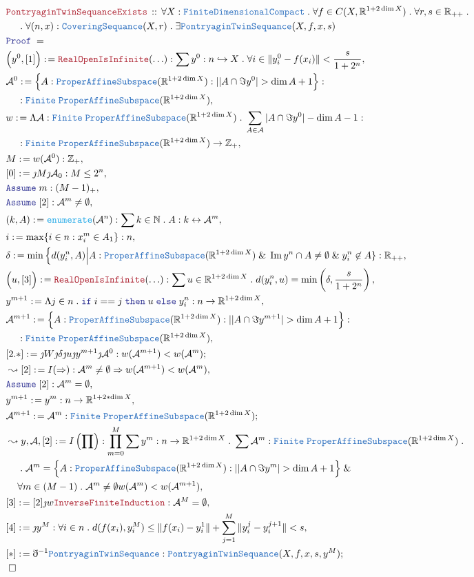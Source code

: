 \documentclass[12pt]{scrartcl}
\newcommand{\TYPE}[1]{\textcolor{NavyBlue}{\mathtt{#1}}}
\newcommand{\FUNC}[1]{\textcolor{Cerulean}{\mathtt{#1}}}
\newcommand{\LOGIC}[1]{\textcolor{Blue}{\mathtt{#1}}}
\newcommand{\THM}[1]{\textcolor{Maroon}{\mathtt{#1}}}
\renewcommand{\.}{\; . \;}
\newcommand{\de}{: \kern 0.1pc =}
\newcommand{\If}{\LOGIC{if} \;}
\newcommand{\Then}{ \; \LOGIC{then} \;}
\newcommand{\Else}{\; \LOGIC{else} \;}
\newcommand{\Act}[1]{\left( #1 \right)}
\newcommand{\Theorem}[2]{& \THM{#1} \, :: \, #2 \\ & \Proof = \\ }
\newcommand{\NewLine}{\\ & \kern 1pc}
\newcommand{\Page}[1]{ \begin{align*} #1 \end{align*}   }
\newcommand{ \bd }{ \ByDef }
\renewcommand{\And}{\; \& \;}
\newcommand{\Imply}{\Rightarrow}
\newcommand{\Int}{\mathbb{Z} }
\newcommand{\Reals}{\mathbb{R} }
\newcommand{\Nat}{\mathbb{N} }
\DeclareMathOperator*{\im}{Im}
\newcommand{\ToInj}{\hookrightarrow}
\newcommand{\ToBij}{\leftrightarrow}
\newcommand{\Say}[3]{& #1 \de #2 : #3, \\}
\newcommand{\Conclude}[3]{& #1 \de #2 : #3; \\}
\newcommand{\Derive}[3]{& \leadsto #1 \de #2 : #3, \\}
\newcommand{\Assume}[2]{& \LOGIC{Assume} \; #1 : #2, \\}
\newcommand{\QED}{\; \square}
\newcommand{\EndProof}{& \QED \\}
\newcommand{\ByDef}{\eth}
\newcommand{\ByConstr}{\jmath}
\newcommand{\Proof}{\LOGIC{Proof} \; }
\newcommand{\A}{\mathcal{A}}
\begin{document}
\Page{
	\Theorem{PontryaginTwinSequanceExists}{
		\forall X : \TYPE{FiniteDimensionalCompact}  \.
		\forall f \in  C(X,\Reals^{1 + 2\dim X}) \.
		\forall r,s \in \Reals_{++} \. \NewLine \.
		\forall (n,x) : \TYPE{CoveringSequance}(X,r) \.
		\exists \TYPE{PontryaginTwinSequance}(X,f,x,s)
	}
	\Say{\Big( y^0,[1]\Big)}{\THM{RealOpenIsInfinite}(\ldots)}{ \sum y^0 : n \ToInj X \.  \forall i \in   \| y^0_i - f(x_i) \| < \frac{s}{1 + 2^n}  }
	\Say{\A^0}{ \Big\{  A : \TYPE{ProperAffineSubspace}(\Reals^{1 + 2\dim X})  : |     | A \cap \Im y^0 | > \dim A +  1      \Big\}}{\NewLine : \TYPE{Finite}\;\TYPE{ProperAffineSubspace}(\Reals^{1 + 2\dim X})}
	\Say{w}{\Lambda \A : \TYPE{Finite}\;\TYPE{ProperAffineSubspace}(\Reals^{1 + 2\dim X}) \. \sum_{A \in \A}   | A \cap \Im y^0 | - \dim A - 1  }
	{\NewLine : \TYPE{Finite}\;\TYPE{ProperAffineSubspace}(\Reals^{1 + 2\dim X}) \to \Int_+}
	\Say{M}{w(\A^0)}{\Int_+}
	\Say{[0]}{\ByConstr M \ByConstr \A_0 }{M \le 2^n}
	\Assume{m}{(M - 1)_+}
	\Assume{[2]}{\A^{m} \neq \emptyset}
	\Say{(k,A)}{\FUNC{enumerate}(\A^n)}{\sum k \in \Nat \. A : k \ToBij \A^m}
	\Say{i}{\max \{ i \in n : x_i^m \in A_1 \}}{n}
	\Say{\delta}{\min \Big\{  d(y_i^n,A)  \Big| A : \TYPE{ProperAffineSubspace}(\Reals^{1 + 2\dim X}) \And \im y^n \cap A \neq \emptyset \And  y^n_i \not \in A  \}}{\Reals_{++}}
	\Say{\Big(u,[3]\Big)}{\THM{RealOpenIsInfinite}(\ldots)}{\sum u \in \Reals^{1 + 2\dim X} \. d( y^n_{i},u) = \min\left( \delta, \frac{s}{1 + 2^n} \right) }
	\Say{y^{m+1}}{\Lambda j \in n \. \If i == j \Then u \Else y^n_i}{n \to \Reals^{1 + 2\dim X}}
	\Say{\A^{m+1}}{ \Big\{  A : \TYPE{ProperAffineSubspace}(\Reals^{1 + 2\dim X})  : |     | A \cap \Im y^{m+1} | > \dim A +  1      \Big\}}
	{\NewLine : \TYPE{Finite}\;\TYPE{ProperAffineSubspace}(\Reals^{1 + 2\dim X})}
	\Conclude{[2.*]}{\ByConstr W \ByConstr \delta \ByConstr u \ByConstr y^{m+1} \ByConstr \A^0}{ w(\A^{m+1}) < w(\A^m)}
	\Derive{[2]}{I(\Imply)}{\A^{m} \neq \emptyset \Imply w(\A^{m+1}) < w(\A^m)  }
	\Assume{[2]}{\A^{m} = \emptyset}
	\Say{y^{m+1}}{y^m}{n \to \Reals^{1  + 2*\dim X}}
	\Conclude{\A^{m+1}}{\A^m}{\TYPE{Finite}\;\TYPE{ProperAffineSubspace}(\Reals^{1 + 2\dim X})}
	\Derive{y,\A,[2]}{I\Act{\prod}}
	{
		\prod^M_{m=0}  \sum y^m : n \to \Reals^{1 + 2\dim X} \. 
		\sum \A^m :  \TYPE{Finite}\;\TYPE{ProperAffineSubspace}(\Reals^{1 + 2\dim X}) \. \NewLine \.
		\A^m =  \Big\{  A : \TYPE{ProperAffineSubspace}(\Reals^{1 + 2\dim X})  : |     | A \cap \Im y^{m} | > \dim A +  1      \Big\} \And \NewLine
		\forall m \in  (M -1) \. \A^m \neq \emptyset w(\A^m) < w(\A^{m+1})
	}
	\Say{[3]}{[2]\ByConstr w \THM{InverseFiniteInduction}}{\A^M = \emptyset}
	\Say{[4]}{\ByConstr y^M}{\forall i \in n \. d(f(x_i),y_i^M) \le  \|f(x_i) - y_i^1 \| + \sum^M_{j=1} \|y^j_i - y^{j+1}_i \| <  s}
	\Conclude{[*]}{\bd^{-1} \TYPE{PontryaginTwinSequance}}{\TYPE{PontryaginTwinSequance}(X,f,x,s,y^M)}
	\EndProof
}
\end{document}
